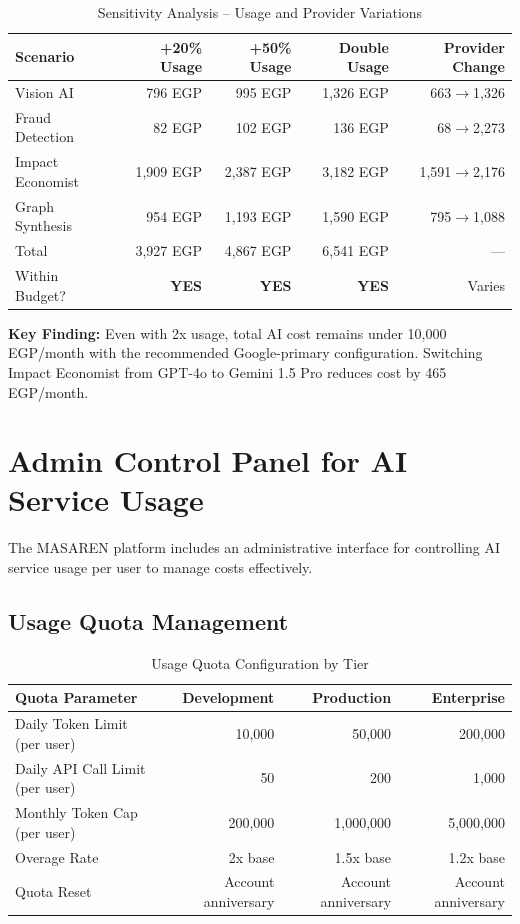 \documentclass[11pt,a4paper]{article}
\begin{document}
\begin{table}[H]
\centering
\footnotesize
\begin{tabular}{|l|r|r|r|r|}
\hline
\textbf{Scenario} & \textbf{+20\% Usage} & \textbf{+50\% Usage} & \textbf{Double Usage} & \textbf{Provider Change} \\
\hline
Vision AI & 796 EGP & 995 EGP & 1,326 EGP & 663$\to$1,326 \\
\hline
Fraud Detection & 82 EGP & 102 EGP & 136 EGP & 68$\to$2,273 \\
\hline
Impact Economist & 1,909 EGP & 2,387 EGP & 3,182 EGP & 1,591$\to$2,176 \\
\hline
Graph Synthesis & 954 EGP & 1,193 EGP & 1,590 EGP & 795$\to$1,088 \\
\hline
Total & 3,927 EGP & 4,867 EGP & 6,541 EGP & --- \\
\hline
Within Budget? & \textbf{YES} & \textbf{YES} & \textbf{YES} & Varies \\
\hline
\end{tabular}
\caption{Sensitivity Analysis -- Usage and Provider Variations}
\end{table}

\noindent\textbf{Key Finding:} Even with 2x usage, total AI cost remains under 10,000 EGP/month with the recommended Google-primary configuration. Switching Impact Economist from GPT-4o to Gemini 1.5 Pro reduces cost by 465 EGP/month.

\newpage

\section{Admin Control Panel for AI Service Usage}

The MASAREN platform includes an administrative interface for controlling AI service usage per user to manage costs effectively.

\subsection{Usage Quota Management}

\begin{table}[H]
\centering
\begin{tabular}{|l|r|r|r|}
\hline
\textbf{Quota Parameter} & \textbf{Development} & \textbf{Production} & \textbf{Enterprise} \\
\hline
Daily Token Limit (per user) & 10,000 & 50,000 & 200,000 \\
\hline
Daily API Call Limit (per user) & 50 & 200 & 1,000 \\
\hline
Monthly Token Cap (per user) & 200,000 & 1,000,000 & 5,000,000 \\
\hline
Overage Rate & 2x base & 1.5x base & 1.2x base \\
\hline
Quota Reset & Account anniversary & Account anniversary & Account anniversary \\
\hline
\end{tabular}
\caption{Usage Quota Configuration by Tier}
\end{table}
\end{document}
